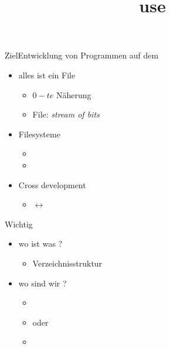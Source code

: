 \documentclass{beamer}
\title[\unix use]{\unix use}
\begin{document}
\frame{\titlepage}

\begin{frame}{Ziel}{Entwicklung von Programmen auf dem \target}
 \begin{itemize}
  \item alles ist ein File 
  \begin{itemize}
   \item $0-te$ Näherung
   \item File: {\em stream of bits}
  \end{itemize}
  \item Filesysteme
  \begin{itemize}
   \item {}
   \item {}
  \end{itemize}
  \item Cross development
  \begin{itemize}
   \item \host $\leftrightarrow$ \target
  \end{itemize}
 \end{itemize}
\end{frame}

\begin{frame}{Wichtig}
 \begin{itemize}
  \item wo ist was ?
  \begin{itemize}
  \item {\Large Verzeichnisstruktur}
  \end{itemize}
  \item wo sind wir ?
  \begin{itemize}
   \item \host
   \item[] oder
   \item \target
  \end{itemize}
 \end{itemize}
\end{frame}
\end{document}
